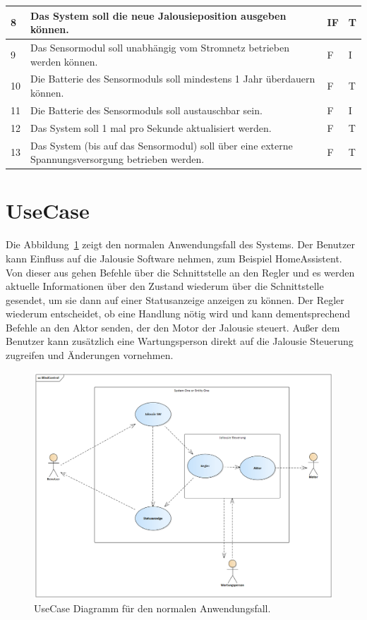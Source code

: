 \begin{longtable}[ht]{p{}  p{} p{} p{}}
	8 & Das System soll die neue Jalousieposition ausgeben können. & IF & T \\* \midrule
	
	9 & Das Sensormodul soll unabhängig vom Stromnetz betrieben werden können. & F & I \\* \midrule
	
	10 & Die Batterie des Sensormoduls soll mindestens 1 Jahr überdauern können. & F & T \\* \midrule
	
	11 & Die Batterie des Sensormoduls soll austauschbar sein. & F & I \\* \midrule
	
	12 & Das System soll 1 mal pro Sekunde aktualisiert werden. & F & T \\* \midrule
	
	13 & Das System (bis auf das Sensormodul) soll über eine externe Spannungsversorgung betrieben werden. & F & T \\* \bottomrule
		
\end{longtable}

\section{UseCase}
Die Abbildung~\ref{fig:UseCase} zeigt den normalen Anwendungsfall des Systems. Der Benutzer kann Einfluss auf die Jalousie Software nehmen, zum Beispiel HomeAssistent. Von dieser aus gehen Befehle über die Schnittstelle an den Regler und es werden aktuelle Informationen über den Zustand wiederum über die Schnittstelle gesendet, um sie dann auf einer Statusanzeige anzeigen zu können. Der Regler wiederum entscheidet, ob eine Handlung nötig wird und kann dementsprechend Befehle an den Aktor senden, der den Motor der Jalousie steuert. Außer dem Benutzer kann zusätzlich eine Wartungsperson direkt auf die Jalousie Steuerung zugreifen und Änderungen vornehmen.
\begin{figure}[hbt]
	\centering
	\includegraphics[width=1\linewidth]{images/UseCase}
	\caption[UseCase Diagramm]{UseCase Diagramm für den normalen Anwendungsfall.}
	\label{fig:UseCase}
\end{figure}